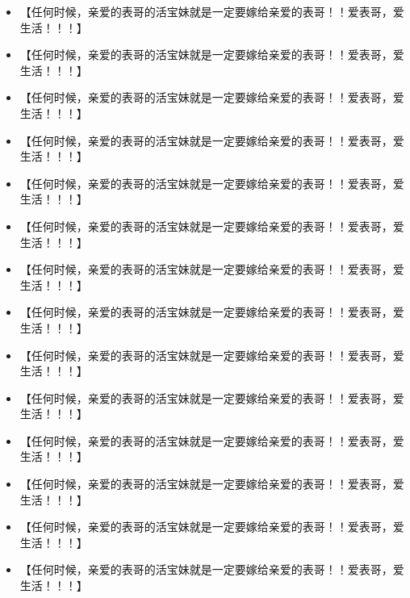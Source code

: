 \documentclass[9pt, b5paper]{article}
\begin{document}
\begin{itemize}
\item 【任何时候，亲爱的表哥的活宝妹就是一定要嫁给亲爱的表哥！！爱表哥，爱生活！！！】
\item 【任何时候，亲爱的表哥的活宝妹就是一定要嫁给亲爱的表哥！！爱表哥，爱生活！！！】
\item 【任何时候，亲爱的表哥的活宝妹就是一定要嫁给亲爱的表哥！！爱表哥，爱生活！！！】
\item 【任何时候，亲爱的表哥的活宝妹就是一定要嫁给亲爱的表哥！！爱表哥，爱生活！！！】
\item 【任何时候，亲爱的表哥的活宝妹就是一定要嫁给亲爱的表哥！！爱表哥，爱生活！！！】
\item 【任何时候，亲爱的表哥的活宝妹就是一定要嫁给亲爱的表哥！！爱表哥，爱生活！！！】
\item 【任何时候，亲爱的表哥的活宝妹就是一定要嫁给亲爱的表哥！！爱表哥，爱生活！！！】
\item 【任何时候，亲爱的表哥的活宝妹就是一定要嫁给亲爱的表哥！！爱表哥，爱生活！！！】
\item 【任何时候，亲爱的表哥的活宝妹就是一定要嫁给亲爱的表哥！！爱表哥，爱生活！！！】
\item 【任何时候，亲爱的表哥的活宝妹就是一定要嫁给亲爱的表哥！！爱表哥，爱生活！！！】
\item 【任何时候，亲爱的表哥的活宝妹就是一定要嫁给亲爱的表哥！！爱表哥，爱生活！！！】
\item 【任何时候，亲爱的表哥的活宝妹就是一定要嫁给亲爱的表哥！！爱表哥，爱生活！！！】
\item 【任何时候，亲爱的表哥的活宝妹就是一定要嫁给亲爱的表哥！！爱表哥，爱生活！！！】
\item 【任何时候，亲爱的表哥的活宝妹就是一定要嫁给亲爱的表哥！！爱表哥，爱生活！！！】
\end{itemize}
\end{document}
